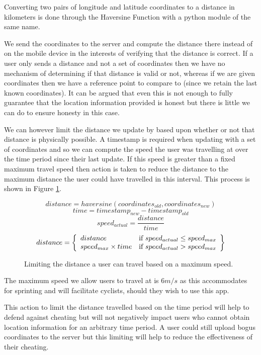 Converting two pairs of longitude and latitude coordinates to a
distance in kilometers is done through the Haversine
Function\cite{haversine} with a python module of the same
name\cite{python_haversine}.

We send the coordinates to the server and compute the distance there
instead of on the mobile device in the interests of verifying that
the distance is correct. If a user only sends a distance and not a
set of coordinates then we have no mechanism of determining if that
distance is valid or not, whereas if we are given coordinates then we
have a reference point to compare to (since we retain the last known
coordinates). It can be argued that even this is not enough to fully
guarantee that the location information provided is honest but there
is little we can do to ensure honesty in this case. 

We can however limit the distance we update by based upon whether or
not that distance is physically possible. A timestamp is required when
updating with a set of coordinates and so we can compute the speed the
user was travelling at over the time period since their last
update. If this speed is greater than a fixed maximum travel speed
then action is taken to reduce the distance to the maximum distance
the user could have travelled in this interval. This process is shown
in Figure \ref{fig:distance_limit}.

\begin{figure}[h]
\begin{equation}
  distance = haversine(coordinates_{old}, coordinates_{new})
\end{equation}
\begin{equation}
  time = timestamp_{new} - timestamp_{old}
\end{equation}
\begin{equation}
  speed_{actual} = \frac{distance}{time}
\end{equation}
\begin{equation}
  distance = \left\{
  \begin{array}{l l}
    distance & \text{if $speed_{actual} \leq speed_{max}$} \\
    speed_{max} \times time & \text{if $speed_{actual} > speed_{max} $}
  \end{array}
  \right\}
\end{equation}
\caption{Limiting the distance a user can travel based on a maximum speed.}
\label{fig:distance_limit}
\end{figure}

The maximum speed we allow users to travel at is $\text{6}m/s$ as this
accommodates for sprinting and will facilitate cyclists, should they
wish to use this app.

This action to limit the distance travelled based on the time period
will help to defend against cheating but will not negatively impact
users who cannot obtain location information for an arbitrary time
period. A user could still upload bogus coordinates to the server but
this limiting will help to reduce the effectiveness of their
cheating.



